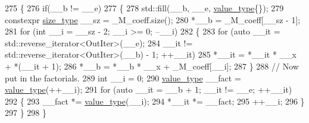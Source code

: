 \begin{DoxyCode}
275         \{
276           \textcolor{keywordflow}{if}(\_\_b != \_\_e)
277             \{
278               std::fill(\_\_b, \_\_e, \hyperlink{class____gnu__cxx_1_1__StaticPolynomial_aad5f3d6d5876b6926b30724aeac649d6}{value\_type}\{\});
279               constexpr \hyperlink{class____gnu__cxx_1_1__StaticPolynomial_a0cc0aa4adab35686ef2474e07f511ff9}{size\_type} \_\_sz = \_M\_coeff.size();
280               *\_\_b = \_M\_coeff[\_\_sz - 1];
281               \textcolor{keywordflow}{for} (\textcolor{keywordtype}{int} \_\_i = \_\_sz - 2; \_\_i >= 0; --\_\_i)
282                 \{
283                   \textcolor{keywordflow}{for} (\textcolor{keyword}{auto} \_\_it = std::reverse\_iterator<OutIter>(\_\_e);
284                            \_\_it != std::reverse\_iterator<OutIter>(\_\_b) - 1; ++\_\_it)
285                     *\_\_it = *\_\_it * \_\_x + *(\_\_it + 1);
286                   *\_\_b = *\_\_b * \_\_x + \_M\_coeff[\_\_i];
287                 \}
288               \textcolor{comment}{//  Now put in the factorials.}
289               \textcolor{keywordtype}{int} \_\_i = 0;
290               \hyperlink{class____gnu__cxx_1_1__StaticPolynomial_aad5f3d6d5876b6926b30724aeac649d6}{value\_type} \_\_fact = \hyperlink{class____gnu__cxx_1_1__StaticPolynomial_aad5f3d6d5876b6926b30724aeac649d6}{value\_type}(++\_\_i);
291               \textcolor{keywordflow}{for} (\textcolor{keyword}{auto} \_\_it = \_\_b + 1; \_\_it != \_\_e; ++\_\_it)
292                 \{
293                   \_\_fact *= \hyperlink{class____gnu__cxx_1_1__StaticPolynomial_aad5f3d6d5876b6926b30724aeac649d6}{value\_type}(\_\_i);
294                   *\_\_it *= \_\_fact;
295                   ++\_\_i;
296                 \}
297             \}
298         \}
\end{DoxyCode}
\mbox{\label{class____gnu__cxx_1_1__StaticPolynomial_aac0b30914533c2e8f2dfd54568632387}} 
